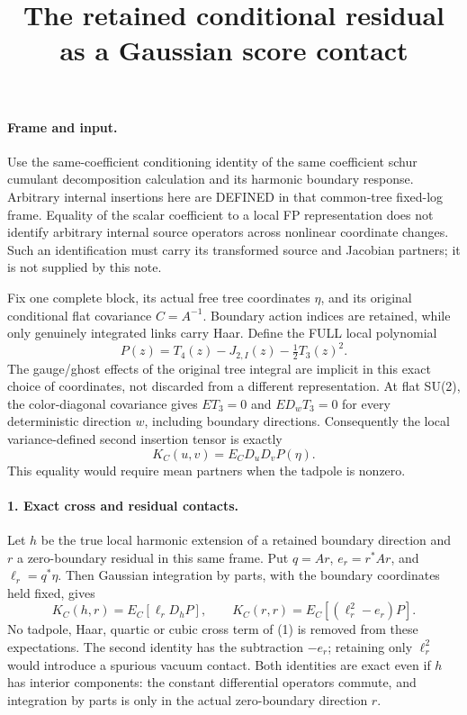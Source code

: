 \documentclass[11pt]{article}
\title{The retained conditional residual as a Gaussian score contact}\author{}\date{}
\begin{document}
\maketitle
\paragraph{Frame and input.}
Use the same-coefficient conditioning identity of the same coefficient schur cumulant decomposition calculation and its
harmonic boundary response. Arbitrary internal insertions here are
DEFINED in that common-tree fixed-log frame. Equality of the scalar
coefficient to a local FP representation does not identify arbitrary
internal source operators across nonlinear coordinate changes.
Such an identification must carry its transformed source and Jacobian
partners; it is not supplied by this note.

Fix one complete block, its actual free tree coordinates $\eta$, and
its original conditional flat covariance $C=A^{-1}$. Boundary action
indices are retained, while only genuinely integrated links carry Haar.
Define the FULL local polynomial
\[
 P(z)=T_4(z)-J_{2,I}(z)-\tfrac12T_3(z)^2.                       \tag{1}
\]
The gauge/ghost effects of the original tree integral are implicit in
this exact choice of coordinates, not discarded from a different
representation. At flat SU(2), the color-diagonal covariance gives
$ET_3=0$ and $ED_wT_3=0$ for every deterministic direction $w$,
including boundary directions. Consequently the local variance-defined
second insertion tensor is exactly
\[
 K_C(u,v)=E_C D_uD_v P(\eta).                                 \tag{2}
\]
This equality would require mean partners when the tadpole is nonzero.

\paragraph{1. Exact cross and residual contacts.}
Let $h$ be the true local harmonic extension of a retained boundary
direction and $r$ a zero-boundary residual in this same frame. Put
$q=Ar$, $e_r=r^*Ar$, and $\ell_r=q^*\eta$. Then Gaussian integration
by parts, with the boundary coordinates held fixed, gives
\[
 \boxed{K_C(h,r)=E_C[\ell_r D_hP],\qquad
 K_C(r,r)=E_C[(\ell_r^2-e_r)P].}                              \tag{3}
\]
No tadpole, Haar, quartic or cubic cross term of (1) is removed from
these expectations. The second identity has the subtraction $-e_r$;
retaining only $\ell_r^2$ would introduce a spurious vacuum contact.
Both identities are exact even if $h$ has interior components: the
constant differential operators commute, and integration by parts is
only in the actual zero-boundary direction $r$.
\end{document}
